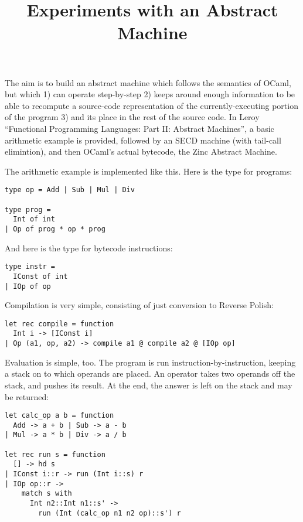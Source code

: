 \documentclass[10pt]{article}
\begin{document}
\title{Experiments with an Abstract Machine}
\maketitle

\noindent The aim is to build an abstract machine which follows the semantics of OCaml, but which 1) can operate step-by-step 2) keeps around enough information to be able to recompute a source-code representation of the currently-executing portion of the program 3) and its place in the rest of the source code. In Leroy ``Functional Programming Languages: Part II: Abstract Machines'', a basic arithmetic example is provided, followed by an SECD machine (with tail-call elimintion), and then OCaml's actual bytecode, the Zinc Abstract Machine.

The arithmetic example is implemented like this. Here is the type for programs:

\begin{verbatim}
type op = Add | Sub | Mul | Div

type prog =
  Int of int
| Op of prog * op * prog
\end{verbatim}

And here is the type for bytecode instructions:

\begin{verbatim}
type instr =
  IConst of int
| IOp of op
\end{verbatim}

Compilation is very simple, consisting of just conversion to  Reverse Polish:

\begin{verbatim}
let rec compile = function
  Int i -> [IConst i]
| Op (a1, op, a2) -> compile a1 @ compile a2 @ [IOp op]
\end{verbatim}

Evaluation is simple, too. The program is run instruction-by-instruction, keeping a stack on to which operands are placed. An operator takes two operands off the stack, and pushes its result. At the end, the answer is left on the stack and may be returned:

\begin{verbatim}
let calc_op a b = function
  Add -> a + b | Sub -> a - b
| Mul -> a * b | Div -> a / b

let rec run s = function
  [] -> hd s
| IConst i::r -> run (Int i::s) r
| IOp op::r ->
    match s with
      Int n2::Int n1::s' ->
        run (Int (calc_op n1 n2 op)::s') r
\end{verbatim}
\end{document}
